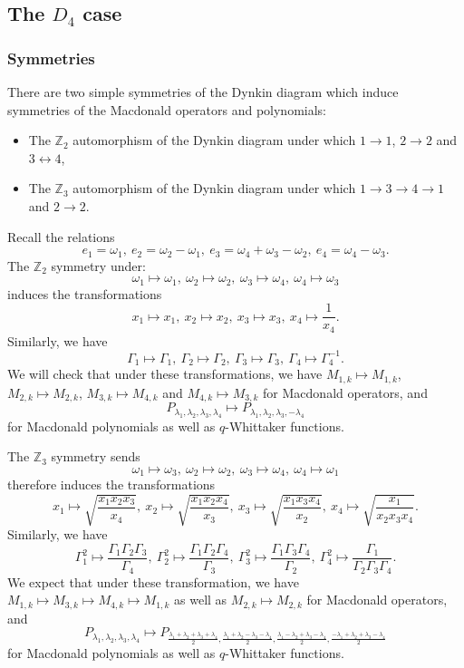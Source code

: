 \documentclass[12pt]{amsart}
\newcommand{\Z}{{\mathbb Z}}
\numberwithin{equation}{section}
\numberwithin{table}{section}
\begin{document}
\begin{appendix}
\subsection{The $D_4$ case}

\subsubsection{Symmetries}

There are two simple symmetries of the Dynkin diagram which induce symmetries of the Macdonald operators and polynomials:
\begin{itemize}
\item 
The $\Z_2$ automorphism of the Dynkin diagram under which $1\to 1$, $2\to 2$ and $3\leftrightarrow 4$,
\item
The $\Z_3$ automorphism of the Dynkin diagram under which $1\to 3\to 4\to 1$ and $2\to 2$. 
\end{itemize}
Recall the relations
$$e_1=\omega_1,\ e_2=\omega_2-\omega_1,\ e_3=\omega_4+\omega_3-\omega_2,\ e_4=\omega_4-\omega_3 .$$
The $\Z_2$ symmetry under:
$$ \omega_1\mapsto \omega_1,\ \omega_2\mapsto \omega_2,\ \omega_3\mapsto \omega_4,\ 
\omega_4\mapsto \omega_3 $$
induces the transformations
\begin{equation}
\label{mapxDtwo}
x_1\mapsto x_1,\ x_2\mapsto x_2,\ x_3\mapsto
x_3,\ x_4\mapsto \frac{1}{x_4} .
\end{equation}
Similarly, we have
$$ \Gamma_1\mapsto \Gamma_1,\ 
 \Gamma_2\mapsto \Gamma_2,\ 
  \Gamma_3\mapsto \Gamma_3,\ 
   \Gamma_4 \mapsto \Gamma_4^{-1} .$$
We will check that under these transformations, we have 
$M_{1,k}\mapsto M_{1,k}$, $M_{2,k}\mapsto M_{2,k}$, $M_{3,k}\mapsto M_{4,k}$ and $M_{4,k}\mapsto M_{3,k}$
for Macdonald operators, and 
$$ P_{\lambda_1,\lambda_2,\lambda_3,\lambda_4}\mapsto P_{\lambda_1,\lambda_2,\lambda_3,-\lambda_4} 
$$
for Macdonald polynomials as well as $q$-Whittaker functions.

The $\Z_3$ symmetry sends
$$ \omega_1\mapsto \omega_3,\ \omega_2\mapsto \omega_2,\ \omega_3\mapsto \omega_4,\ 
\omega_4\mapsto \omega_1 $$
therefore induces the transformations
\begin{equation}
\label{mapxD}
x_1\mapsto \sqrt{\frac{x_1x_2x_3}{x_4}},\ x_2\mapsto\sqrt{\frac{x_1x_2x_4}{x_3}},\ x_3\mapsto
\sqrt{\frac{x_1x_3x_4}{x_2}},\ x_4\mapsto \sqrt{\frac{x_1}{x_2x_3x_4}} .
\end{equation}
Similarly, we have
$$ \Gamma_1^2\mapsto \frac{\Gamma_1\Gamma_2\Gamma_3}{\Gamma_4},\ 
 \Gamma_2^2\mapsto \frac{\Gamma_1\Gamma_2\Gamma_4}{\Gamma_3},\ 
  \Gamma_3^2\mapsto  \frac{\Gamma_1\Gamma_3\Gamma_4}{\Gamma_2},\ 
   \Gamma_4^2\mapsto \frac{\Gamma_1}{\Gamma_2\Gamma_3\Gamma_4} .$$
We expect that under these transformation, we have 
$M_{1,k}\mapsto M_{3,k}\mapsto M_{4,k}\mapsto M_{1,k}$ as well as $M_{2,k}\mapsto M_{2,k}$
for Macdonald operators, and 
$$ P_{\lambda_1,\lambda_2,\lambda_3,\lambda_4}\mapsto P_{\frac{\lambda_1+\lambda_2+\lambda_3+\lambda_4}{2},\frac{\lambda_1+\lambda_2-\lambda_3-\lambda_4}{2},\frac{\lambda_1-\lambda_2+\lambda_3-\lambda_4}{2},\frac{-\lambda_1+\lambda_2+\lambda_3-\lambda_4}{2}} $$
for Macdonald polynomials as well as $q$-Whittaker functions.


\end{appendix}
\end{document}
